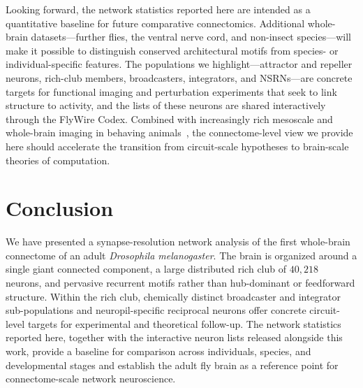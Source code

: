 \documentclass[11pt]{article}
\begin{document}
Looking forward, the network statistics reported here are intended as a
quantitative baseline for future comparative connectomics. Additional
whole-brain datasets---further flies, the ventral nerve cord, and
non-insect species---will make it possible to distinguish conserved
architectural motifs from species- or individual-specific features. The
populations we highlight---attractor and repeller neurons, rich-club
members, broadcasters, integrators, and NSRNs---are concrete targets for
functional imaging and perturbation experiments that seek to link
structure to activity, and the lists of these neurons are shared
interactively through the FlyWire Codex. Combined with increasingly rich
mesoscale and whole-brain imaging in behaving
animals~\cite{mann2021coupling,ahrens2013whole}, the connectome-level
view we provide here should accelerate the transition from circuit-scale
hypotheses to brain-scale theories of computation.

\section{Conclusion}

We have presented a synapse-resolution network analysis of the first
whole-brain connectome of an adult \textit{Drosophila melanogaster}. The
brain is organized around a single giant connected component, a large
distributed rich club of $40{,}218$ neurons, and pervasive recurrent
motifs rather than hub-dominant or feedforward structure. Within the rich
club, chemically distinct broadcaster and integrator sub-populations and
neuropil-specific reciprocal neurons offer concrete circuit-level targets
for experimental and theoretical follow-up. The network statistics
reported here, together with the interactive neuron lists released
alongside this work, provide a baseline for comparison across individuals,
species, and developmental stages and establish the adult fly brain as a
reference point for connectome-scale network neuroscience.



\end{document}
